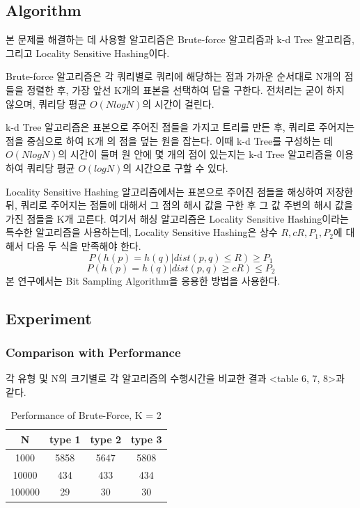 \documentclass{sig-alternate-05-2015}
\begin{document}
\begin{CJK}{UTF8}{mj}
\subsection{Algorithm}
본 문제를 해결하는 데 사용할 알고리즘은 Brute-force 알고리즘과 k-d Tree 알고리즘, 그리고 Locality Sensitive Hashing이다.

Brute-force 알고리즘은 각 쿼리별로 쿼리에 해당하는 점과 가까운 순서대로 N개의 점들을 정렬한 후, 가장 앞선 K개의 표본을 선택하여 답을 구한다. 전처리는 굳이 하지 않으며, 쿼리당 평균 $O(N log N)$의 시간이 걸린다.

k-d Tree 알고리즘은 표본으로 주어진 점들을 가지고 트리를 만든 후, 쿼리로 주어지는 점을 중심으로 하여 K개 의 점을 덮는 원을 잡는다. 이때 k-d Tree를 구성하는 데 $O(N log N)$의 시간이 들며 원 안에 몇 개의 점이 있는지는 k-d Tree 알고리즘을 이용하여 쿼리당 평균 $O(log N)$의 시간으로 구할 수 있다.

Locality Sensitive Hashing 알고리즘에서는 표본으로 주어진 점들을 해싱하여 저장한 뒤, 쿼리로 주어지는 점들에 대해서 그 점의 해시 값을 구한 후 그 값 주변의 해시 값을 가진 점들을 K개 고른다. 여기서 해싱 알고리즘은 Locality Sensitive Hashing이라는 특수한 알고리즘을 사용하는데, Locality Sensitive Hashing은 상수 $R, cR, P_1, P_2$에 대해서 다음 두 식을 만족해야 한다.
\begin{equation} P(h(p)=h(q) | dist(p,q) \leq R) \geq P_1 \end{equation}
\begin{equation} P(h(p)=h(q) | dist(p,q) \geq cR) \leq P_2 \end{equation}
본 연구에서는 Bit Sampling Algorithm\cite{bowman:reasoning, clark:pct, braams:babel,	 herlihy:methodology}을 응용한 방법을 사용한다.
\subsection{Experiment}
\subsubsection{Comparison with Performance}
각 유형 및 N의 크기별로 각 알고리즘의 수행시간을 비교한 결과 <table 6, 7, 8>과 같다.
\begin{table}
\centering
\caption{Performance of Brute-Force, K = 2}
\begin{tabular}{|c|c|c|c|} \hline
N & type 1 & type 2 & type 3 \\ \hline
1000 & 5858 & 5647 & 5808 \\ \hline
10000 & 434 & 433 & 434 \\ \hline
100000 & 29 & 30 & 30 \\ 
\hline\end{tabular}
\end{table}


\end{CJK}
\end{document}
